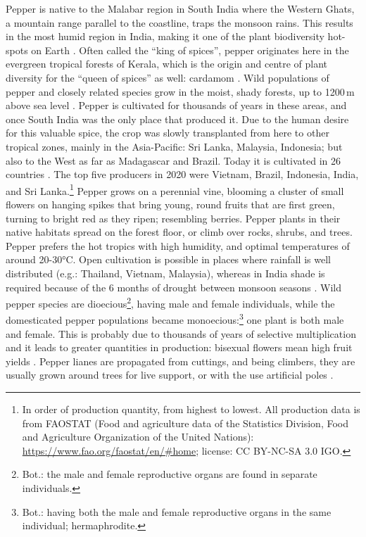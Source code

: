 Pepper is native to the Malabar region in South India where the Western Ghats, a mountain range parallel to the coastline, traps the monsoon rains. This results in the most humid region in India, making it one of the plant biodiversity hot-spots on Earth \autocite[1]{ravindran_black_2000}. Often called the ``king of spices'', pepper originates here in the evergreen tropical forests of Kerala, which is the origin and centre of plant diversity for the ``queen of spices'' as well: cardamom \autocite[1]{ravindran_black_2000}.
Wild populations of pepper and closely related species grow in the moist, shady forests, up to 1200\,m above sea level \autocite{ravindran_piper_2017}. Pepper is cultivated for thousands of years in these areas, and once South India was the only place that produced it. Due to the human desire for this valuable spice, the crop was slowly transplanted from here to other tropical zones, mainly in the Asia-Pacific: Sri Lanka, Malaysia, Indonesia; but also to the West as far as Madagascar and Brazil. Today it is cultivated in 26 countries \autocite{ravindran_black_2000}. The top five producers in 2020 were Vietnam, Brazil, Indonesia, India, and Sri Lanka.\footnote{In order of production quantity, from highest to lowest. All production data is from FAOSTAT (Food and agriculture data of the Statistics Division, Food and Agriculture Organization of the United Nations): \url{https://www.fao.org/faostat/en/\#home}; license: CC BY-NC-SA 3.0 IGO.}
Pepper grows on a perennial vine, blooming a cluster of small flowers on hanging spikes that bring young, round fruits that are first green, turning to bright red as they ripen; resembling berries. Pepper plants in their native habitats spread on the forest floor, or climb over rocks, shrubs, and trees. Pepper prefers the hot tropics with high humidity, and optimal temperatures of around 20-30°C. Open cultivation is possible in places where rainfall is well distributed (e.g.: Thailand, Vietnam, Malaysia), whereas in India shade is required because of the 6 months of drought between monsoon seasons \autocite{ravindran_piper_2017}. Wild pepper species are dioecious\footnote{Bot.: the male and female reproductive organs are found in separate individuals.}, having male and female individuals, while the domesticated pepper populations became monoecious:\footnote{Bot.: having both the male and female reproductive organs in the same individual; hermaphrodite.} one plant is both male and female. This is probably due to thousands of years of selective multiplication and it leads to greater quantities in production: bisexual flowers mean high fruit yields \autocite[38]{ravindran_black_2000}.
Pepper lianes are propagated from cuttings, and being climbers, they are usually grown around trees for live support, or with the use artificial poles \autocite[216]{van_wyk_culinary_2014}. 

